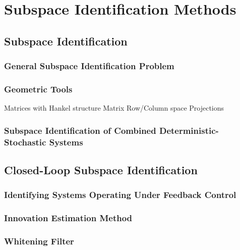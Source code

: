 \chapter{Subspace Identification Methods}


\section{Subspace Identification}

\subsection{General Subspace Identification Problem}

\subsection{Geometric Tools}
Matrices with Hankel structure
Matrix Row/Column space
Projections

\subsection{Subspace Identification of Combined Deterministic-Stochastic Systems}


\section{Closed-Loop Subspace Identification}

\subsection{Identifying Systems Operating Under Feedback Control}

\subsection{Innovation Estimation Method}

\subsection{Whitening Filter}
